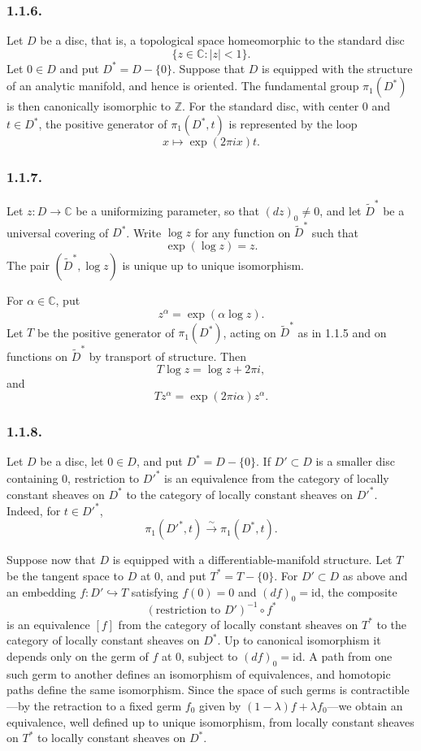 \subsubsection*{1.1.6.}
Let $D$ be a disc, that is, a topological space homeomorphic to the
standard disc
\[
\{z\in\mathbb C:|z|<1\}.
\]
Let $0\in D$ and put $D^*=D-\{0\}$.  Suppose that $D$ is equipped
with the structure of an analytic manifold, and hence is oriented.
The fundamental group $\pi_1(D^*)$ is then canonically isomorphic to
$\mathbb Z$.  For the standard disc, with center $0$ and
$t\in D^*$, the positive generator of $\pi_1(D^*,t)$ is represented
by the loop
\[
x\longmapsto \exp(2\pi i x)t.
\]

\subsubsection*{1.1.7.}
Let $z:D\longrightarrow\mathbb C$ be a uniformizing parameter, so
that $(dz)_0\ne0$, and let $\widetilde D^*$ be a universal covering
of $D^*$.  Write $\log z$ for any function on $\widetilde D^*$ such
that
\[
\exp(\log z)=z.
\]
The pair $(\widetilde D^*,\log z)$ is unique up to unique
isomorphism.

For $\alpha\in\mathbb C$, put
\[
z^\alpha=\exp(\alpha\log z).
\]
Let $T$ be the positive generator of $\pi_1(D^*)$, acting on
$\widetilde D^*$ as in 1.1.5 and on functions on
$\widetilde D^*$ by transport of structure.  Then
\begin{equation}\tag{1.1.7.1}
T\log z=\log z+2\pi i,
\end{equation}
and
\begin{equation}\tag{1.1.7.2}
Tz^\alpha=\exp(2\pi i\alpha)z^\alpha.
\end{equation}

\subsubsection*{1.1.8.}
Let $D$ be a disc, let $0\in D$, and put $D^*=D-\{0\}$.  If
$D'\subset D$ is a smaller disc containing $0$, restriction to
$D'^{*}$ is an equivalence from the category of locally constant
sheaves on $D^*$ to the category of locally constant sheaves on
$D'^{*}$.  Indeed, for $t\in D'^{*}$,
\[
\pi_1(D'^{*},t)\xrightarrow{\ \sim\ }\pi_1(D^*,t).
\]

Suppose now that $D$ is equipped with a differentiable-manifold
structure.  Let $T$ be the tangent space to $D$ at $0$, and put
$T^*=T-\{0\}$.  For $D'\subset D$ as above and an embedding
$f:D'\hookrightarrow T$ satisfying $f(0)=0$ and $(df)_0=\mathrm{id}$,
the composite
\[
(\text{restriction to }D')^{-1}\circ f^*
\]
is an equivalence $[f]$ from the category of locally constant sheaves
on $T^*$ to the category of locally constant sheaves on $D^*$.
Up to canonical isomorphism it depends only on the germ of $f$ at
$0$, subject to $(df)_0=\mathrm{id}$.  A path from one such germ to
another defines an isomorphism of equivalences, and homotopic paths
define the same isomorphism.  Since the space of such germs is
contractible---by the retraction to a fixed germ $f_0$ given by
$(1-\lambda)f+\lambda f_0$---we obtain an equivalence, well defined
up to unique isomorphism, from locally constant sheaves on $T^*$ to
locally constant sheaves on $D^*$.

